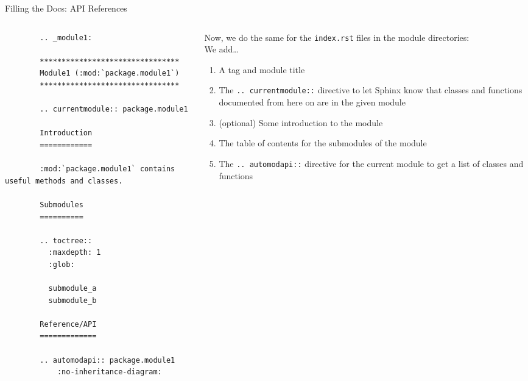 \begin{darkframe}[fragile]{Filling the Docs: API References}

  \begin{columns}[onlytextwidth]
    \begin{column}{0.52\textwidth}
      \scriptsize
      \begin{verbatim}
        .. _module1:

        ********************************
        Module1 (:mod:`package.module1`)
        ********************************

        .. currentmodule:: package.module1

        Introduction
        ============

        :mod:`package.module1` contains useful methods and classes.

        Submodules
        ==========

        .. toctree::
          :maxdepth: 1
          :glob:

          submodule_a
          submodule_b

        Reference/API
        =============

        .. automodapi:: package.module1
            :no-inheritance-diagram:
      \end{verbatim}
    \end{column}
    \hfill
    \begin{column}{0.46\textwidth}
      Now, we do the same for the \texttt{index.rst} files in the module directories:\\[1em]
      We add\dots
      \begin{enumerate}
        \setlength{\itemsep}{1.5em}
        \item A tag and module title
        \item The \texttt{.. currentmodule::} directive to let Sphinx know that
          classes and functions documented from here on are in the given module
        \item (optional) Some introduction to the module
        \item The table of contents for the submodules of the module
        \item The \texttt{.. automodapi::} directive for the current module to get a list of
          classes and functions
      \end{enumerate}
    \end{column}
  \end{columns}
\end{darkframe}

